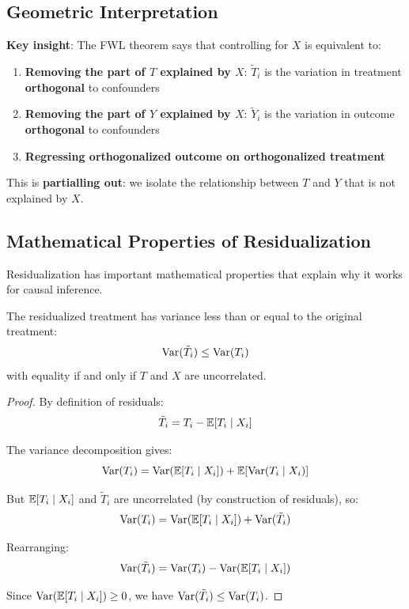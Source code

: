 \subsection{Geometric Interpretation}\label{_geometric_interpretation}

\textbf{Key insight}: The FWL theorem says that controlling for \(X\) is
equivalent to:

\begin{enumerate}
\def\labelenumi{\arabic{enumi}.}
\item
  \textbf{Removing the part of \(T\) explained by \(X\)}:
  \(\tilde{T}_i\) is the variation in treatment \textbf{orthogonal} to
  confounders
\item
  \textbf{Removing the part of \(Y\) explained by \(X\)}:
  \(\tilde{Y}_i\) is the variation in outcome \textbf{orthogonal} to
  confounders
\item
  \textbf{Regressing orthogonalized outcome on orthogonalized treatment}
\end{enumerate}

This is \textbf{partialling out}: we isolate the relationship between
\(T\) and \(Y\) that is not explained by \(X\).

\subsection{Mathematical Properties of
Residualization}\label{_mathematical_properties_of_residualization}

Residualization has important mathematical properties that explain why
it works for causal inference.

\begin{theorem}
\label{thm:variance_reduction}
The residualized treatment has variance less than or equal to the original treatment:
\[
\mathrm{Var}(\tilde{T}_i) \leq \mathrm{Var}(T_i)
\]
with equality if and only if $T$ and $X$ are uncorrelated.
\end{theorem}

\begin{proof}
By definition of residuals:
\[
\tilde{T}_i = T_i - \mathbb{E}[T_i \mid X_i]
\]

The variance decomposition gives:
\[
\mathrm{Var}(T_i) = \mathrm{Var}(\mathbb{E}[T_i \mid X_i]) + \mathbb{E}[\mathrm{Var}(T_i \mid X_i)]
\]

But $\mathbb{E}[T_i \mid X_i]$ and $\tilde{T}_i$ are uncorrelated (by construction of residuals), so:
\[
\mathrm{Var}(T_i) = \mathrm{Var}(\mathbb{E}[T_i \mid X_i]) + \mathrm{Var}(\tilde{T}_i)
\]

Rearranging:
\[
\mathrm{Var}(\tilde{T}_i) = \mathrm{Var}(T_i) - \mathrm{Var}(\mathbb{E}[T_i \mid X_i])
\]

Since $\mathrm{Var}(\mathbb{E}[T_i \mid X_i]) \geq 0$, we have $\mathrm{Var}(\tilde{T}_i) \leq \mathrm{Var}(T_i)$.
\end{proof}

